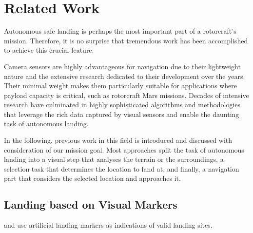 \chapter{Related Work}
\label{sec:relwork}


Autonomous safe landing is perhaps the most important part of a rotorcraft's mission. Therefore, it is no surprise that tremendous work has been accomplished to achieve this crucial feature. 

Camera sensors are highly advantageous for navigation due to their lightweight nature and the extensive research dedicated to their development over the years. Their minimal weight makes them particularly suitable for applications where payload capacity is critical, such as rotorcraft Mars missions. Decades of intensive research have culminated in highly sophisticated algorithms and methodologies that leverage the rich data captured by visual sensors and enable the daunting task of autonomous landing.

In the following, previous work in this field is introduced and discussed with consideration of our mission goal. Most approaches split the task of autonomous landing into a visual step that analyses the terrain or the surroundings, a selection task that determines the location to land at, and finally, a navigation part that considers the selected location and approaches it.

\section{Landing based on Visual Markers}
\citep{Saripalli2002VisionBasedLanding,Falanga2017QuadrotorLanding} and \citep{Mu2023VisionBasedLanding} use artificial landing markers as indications of valid landing sites. 

